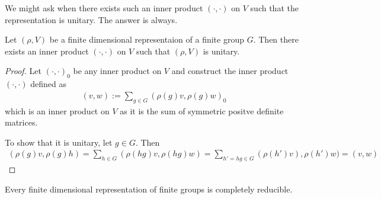 We might ask when there exists such an inner product $(\cdot,\cdot)$ on $V$ such that the representation is unitary. The answer is always.
\begin{thm}[]
  Let $(\rho,V)$ be a finite dimensional representaion of a finite group $G$. Then there exists an inner product $(\cdot,\cdot)$ on $V$ such that $(\rho,V)$ is unitary.
\end{thm}
\begin{proof}
  Let $(\cdot,\cdot)_{0}$ be any inner product on $V$ and construct the inner product $(\cdot,\cdot)$ defined as
  \begin{align*}
    (v,w) := \sum_{g \in G} (\rho(g)v, \rho(g)w)_0
  \end{align*}
  which is an inner product on $V$ as it is the sum of symmetric positve definite matrices.
  
  To show that it is unitary, let $g \in G$. Then
  \begin{align*}
    (\rho(g)v, \rho(g)h) = \sum_{h \in G}(\rho(hg)v, \rho(hg)w) = \sum_{h' = hg \in G} (\rho(h')v),\rho(h')w) = (v,w)
  \end{align*}
\end{proof}

\begin{cor}[]
  Every finite dimensional representation of finite groups is completely reducible.
\end{cor}

